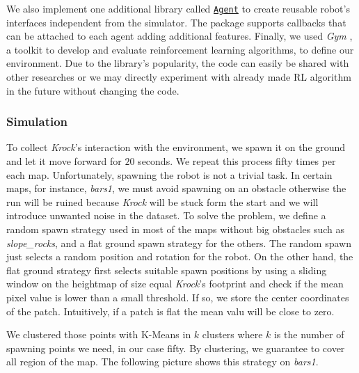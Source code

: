 \documentclass[../document.tex]{subfiles}
\begin{document}
We also implement one additional library called \href{https://github.com/FrancescoSaverioZuppichini/Master-Thesis/tree/master/core/simulation/agent}{\texttt{Agent}} to create reusable robot's interfaces independent from the simulator. The package supports callbacks that can be attached to each agent adding additional features. Finally, we used \emph{Gym} \cite{gym}, a toolkit to develop and evaluate reinforcement learning algorithms, to define our environment. Due to the library's popularity,  the code can easily be shared with other researches or we may directly experiment with already made RL algorithm in the future without changing the code.

\subsubsection{Simulation}
To collect \emph{Krock}'s interaction with the environment, we spawn it on the ground and let it move forward for $20$ seconds. We repeat this process fifty times per each map.
    Unfortunately, spawning the robot is not a trivial task. In certain maps, for instance, \emph{bars1}, we must avoid spawning on an obstacle otherwise the run will be ruined because \emph{Krock} will be stuck form the start and we will introduce unwanted noise in the dataset. To solve the problem, we define a random spawn strategy used in most of the maps without big obstacles such as \emph{slope\_rocks}, and a flat ground spawn strategy for the others. The random spawn just selects a random position and rotation for the robot. On the other hand, the flat ground strategy first selects suitable spawn positions by using a sliding window on the heightmap of size equal \emph{Krock}'s footprint and check if the mean pixel value is lower than a small threshold. If so, we store the center coordinates of the patch. Intuitively, if a patch is flat the mean valu will be close to zero.
    
We clustered those points with K-Means in $k$ clusters where $k$ is the number of spawning points we need, in our case fifty. By clustering, we guarantee to cover all region of the map. The following picture shows this strategy on \emph{bars1}.
\end{document}

